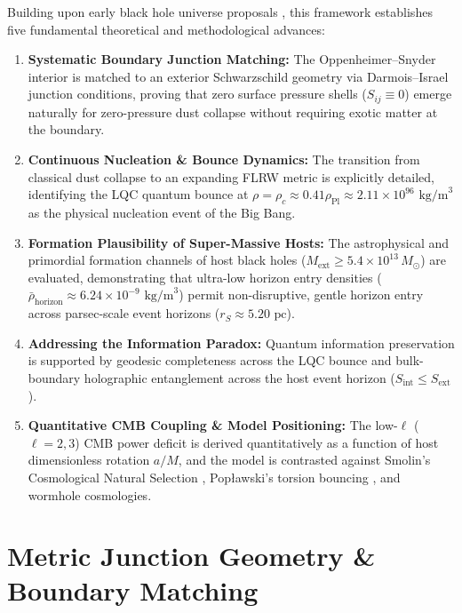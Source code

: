\documentclass[11pt,a4paper]{article}
\begin{document}
Building upon early black hole universe proposals \cite{pathria1972, smolin1992, poplawski2010, poplawski2016, gaztanaga2022}, this framework establishes five fundamental theoretical and methodological advances:
\begin{enumerate}
    \item \textbf{Systematic Boundary Junction Matching:} The Oppenheimer--Snyder interior is matched to an exterior Schwarzschild geometry via Darmois--Israel junction conditions, proving that zero surface pressure shells ($S_{ij} \equiv 0$) emerge naturally for zero-pressure dust collapse without requiring exotic matter at the boundary.
    \item \textbf{Continuous Nucleation \& Bounce Dynamics:} The transition from classical dust collapse to an expanding FLRW metric is explicitly detailed, identifying the LQC quantum bounce at $\rho = \rho_c \approx 0.41 \rho_{\text{Pl}} \approx 2.11 \times 10^{96} \text{ kg/m}^3$ as the physical nucleation event of the Big Bang.
    \item \textbf{Formation Plausibility of Super-Massive Hosts:} The astrophysical and primordial formation channels of host black holes ($M_{\text{ext}} \ge 5.4 \times 10^{13} \, M_\odot$) are evaluated, demonstrating that ultra-low horizon entry densities ($\bar{\rho}_{\text{horizon}} \approx 6.24 \times 10^{-9} \text{ kg/m}^3$) permit non-disruptive, gentle horizon entry across parsec-scale event horizons ($r_S \approx 5.20 \text{ pc}$).
    \item \textbf{Addressing the Information Paradox:} Quantum information preservation is supported by geodesic completeness across the LQC bounce and bulk-boundary holographic entanglement across the host event horizon ($S_{\text{int}} \le S_{\text{ext}}$).
    \item \textbf{Quantitative CMB Coupling \& Model Positioning:} The low-$\ell$ ($\ell=2,3$) CMB power deficit is derived quantitatively as a function of host dimensionless rotation $a/M$, and the model is contrasted against Smolin's Cosmological Natural Selection \cite{smolin1992}, Pop{\l}awski's torsion bouncing \cite{poplawski2010, poplawski2016}, and wormhole cosmologies.
\end{enumerate}

\section{Metric Junction Geometry \& Boundary Matching}\label{sec:junction}
\end{document}
